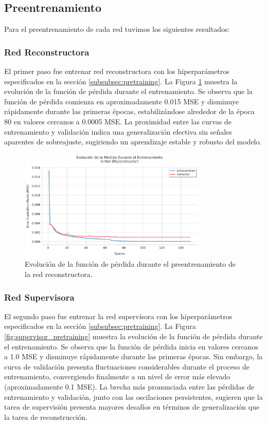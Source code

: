 \subsection{Preentrenamiento}
 
Para el preentrenamiento de cada red tuvimos los siguientes resultados:

\subsubsection{Red Reconstructora}

El primer paso fue entrenar red reconstructora con los hiperparámetros especificados en la sección \ref{subsubsec:pretraining}. La Figura \ref{fig:reconstructor_pretraining} muestra la evolución de la función de pérdida durante el entrenamiento. Se observa que la función de pérdida comienza en aproximadamente 0.015 MSE y disminuye rápidamente durante las primeras épocas, estabilizándose alrededor de la época 80 en valores cercanos a 0.0005 MSE. La proximidad entre las curvas de entrenamiento y validación indica una generalización efectiva sin señales aparentes de sobreajuste, sugiriendo un aprendizaje estable y robusto del modelo.

\begin{figure}[H]
    \centering
    \includegraphics[width=0.8\textwidth]{Images/perdidas_entrenamiento_recon.png}
    \caption{Evolución de la función de pérdida durante el preentrenamiento de la red reconstructora.}
    \label{fig:reconstructor_pretraining}
\end{figure}

\subsubsection{Red Supervisora}

El segundo paso fue entrenar la red supervisora con los hiperparámetros especificados en la sección \ref{subsubsec:pretraining}. La Figura \ref{fig:supervisor_pretraining} muestra la evolución de la función de pérdida durante el entrenamiento. Se observa que la función de pérdida inicia en valores cercanos a 1.0 MSE y disminuye rápidamente durante las primeras épocas. Sin embargo, la curva de validación presenta fluctuaciones considerables durante el proceso de entrenamiento, convergiendo finalmente a un nivel de error más elevado (aproximadamente 0.1 MSE). La brecha más pronunciada entre las pérdidas de entrenamiento y validación, junto con las oscilaciones persistentes, sugieren que la tarea de supervisión presenta mayores desafíos en términos de generalización que la tarea de reconstrucción.

